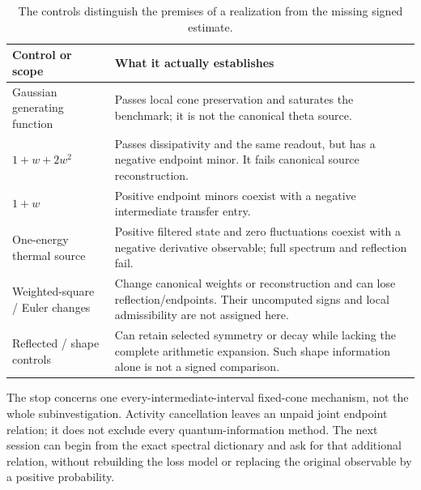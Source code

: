 \documentclass[11pt,letterpaper]{article}
\numberwithin{equation}{section}
\theoremstyle{remark}
\begin{document}
\begin{table}[htbp]
\centering\small
\renewcommand{\arraystretch}{1.17}
\begin{tabularx}{\textwidth}{@{}>{\raggedright\arraybackslash}p{}X@{}}
\toprule
Control or scope & What it actually establishes\\
\midrule
Gaussian generating function & Passes local cone preservation and saturates the benchmark; it is not the canonical theta source.\\
$1+w+2w^2$ & Passes dissipativity and the same readout, but has a negative endpoint minor. It fails canonical source reconstruction.\\
$1+w$ & Positive endpoint minors coexist with a negative intermediate transfer entry.\\
One-energy thermal source & Positive filtered state and zero fluctuations coexist with a negative derivative observable; full spectrum and reflection fail.\\
Weighted-square / Euler changes & Change canonical weights or reconstruction and can lose reflection/endpoints. Their uncomputed signs and local admissibility are not assigned here.\\
Reflected / shape controls & Can retain selected symmetry or decay while lacking the complete arithmetic expansion. Such shape information alone is not a signed comparison.\\
\bottomrule
\end{tabularx}
\caption{The controls distinguish the premises of a realization from the missing signed estimate.}
\end{table}

The stop concerns one every-intermediate-interval fixed-cone mechanism,
not the whole subinvestigation. Activity cancellation leaves an unpaid
joint endpoint relation; it does not exclude every quantum-information
method. The next session can begin from the exact spectral dictionary
and ask for that additional relation, without rebuilding the loss model
or replacing the original observable by a positive probability.

\appendix
\end{document}

